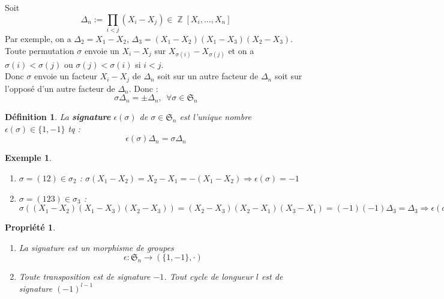 \documentclass[a4paper, oneside]{report}
\theoremstyle{break}
\newtheorem{defi}[thm]{Définition}
\newtheorem{propr}[thm]{Propriété}
\newtheorem{exem}[thm]{Exemple}
\DeclareMathOperator{\Z}{\mathbb{Z}}
\renewcommand{\S}{\mathfrak{S}}
\begin{document}
Soit 
$$\Delta_n := \prod_{i<j}(X_i-X_j)\in \Z[X_i,...,X_n]$$
Par exemple, on a $\Delta_2=X_1-X_2$, $\Delta_3=(X_1-X_2)(X_1-X_3)(X_2-X_3)$.\\
Toute permutation $\sigma$ envoie un $X_i-X_j$ sur $X_{\sigma(i)}-X_{\sigma(j)}$ et on a $\sigma(i)<\sigma(j)$ ou $\sigma(j)<\sigma(i)$ si $i<j$.\\
Donc $\sigma$ envoie un facteur $X_i-X_j$ de $\Delta_n$ soit sur un autre facteur de $\Delta_n$ soit sur l'opposé d'un autre facteur de $\Delta_n$. Donc :
$$\sigma \Delta_n=\pm \Delta_n,~~\forall\sigma\in \S_n$$

\begin{defi}
	La \textbf{signature} $\epsilon(\sigma)$ de $\sigma\in \S_n$ est l'unique nombre $\epsilon(\sigma)\in \{1,-1\}$ tq :
	$$\epsilon(\sigma)\Delta_n=\sigma\Delta_n$$
\end{defi}

\begin{exem}
	\begin{enumerate}
		\item $\sigma = (12)\in \sigma_2$ : $\sigma(X_1-X_2)=X_2-X_1=-(X_1-X_2)\Rightarrow \epsilon(\sigma)=-1$
		\item $\sigma=(123)\in \sigma_3$ : $\sigma((X_1-X_2)(X_1-X_3)(X_2-X_3))=(X_2-X_3)(X_2-X_1)(X_3-X_1)=(-1)(-1)\Delta_3=\Delta_3\Rightarrow \epsilon(\sigma)=1$
	\end{enumerate}
\end{exem}

\begin{propr}
	\begin{enumerate}
		\item La signature est un morphisme de groupes
		$$ \epsilon : \S_n\rightarrow (\{1,-1\},\cdot)$$
		
		\item Toute transposition est de signature $-1$. Tout cycle de longueur $l$ est de signature $(-1)^{l-1}$
	\end{enumerate}
\end{propr}
\end{document}
